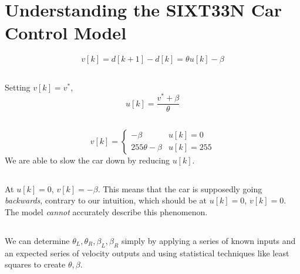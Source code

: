 \documentclass[]{article}
\begin{document}
\section{Understanding the SIXT33N Car Control Model}

\begin{equation}
	v[k] = d[k + 1] - d[k] = \theta u[k] - \beta
\end{equation}

\subsection{}

Setting \(v[k] = v^\ast\),
\begin{equation}
	u[k] = \frac{v^\ast + \beta}{\theta}
\end{equation}

\subsection{}

\begin{equation}
	v[k] =
	\begin{cases}
	-\beta & u[k] = 0 \\
	255\theta - \beta & u[k] = 255
	\end{cases}
\end{equation}
We are able to slow the car down by reducing \(u[k]\).

\subsection{}

At \(u[k] = 0\), \(v[k] = -\beta\).
This means that the car is supposedly going \emph{backwards}, contrary to our intuition, which should be at \(u[k] = 0\), \(v[k] = 0\).
The model \emph{cannot} accurately describe this phenomenon.

\subsection{}

We can determine \(\theta_L, \theta_R, \beta_L, \beta_R\) simply by applying a series of known inputs and an expected series of velocity outputs and using statistical techniques like least squares to create \(\theta, \beta\).

\subsection{}
\end{document}
